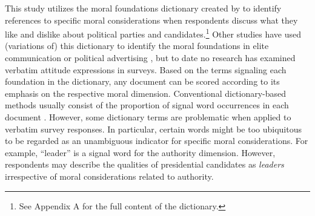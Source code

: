 \documentclass[12pt]{article}
\begin{document}
This study utilizes the moral foundations dictionary created by \citet{graham2009liberals} to identify references to specific moral considerations when respondents discuss what they like and dislike about political parties and candidates.\footnote{See Appendix A for the full content of the dictionary.} Other studies have used (variations of) this dictionary to identify the moral foundations in elite communication \citep[e.g.,][]{clifford2015concerns} or political advertising \citep[e.g.,][]{lipsitz2017playing}, but to date no research has examined verbatim attitude expressions in surveys. Based on the terms signaling each foundation in the dictionary, any document can be scored according to its emphasis on the respective moral dimension. Conventional dictionary-based methods usually consist of the proportion of signal word occurrences in each document \citep[e.g.,][]{graham2009liberals}. However, some dictionary terms are problematic when applied to verbatim survey responses. In particular, certain words might be too ubiquitous to be regarded as an unambiguous indicator for specific moral considerations. For example, ``leader'' is a signal word for the authority dimension. However, respondents may describe the qualities of presidential candidates as \textit{leaders} irrespective of moral considerations related to authority.
\end{document}
